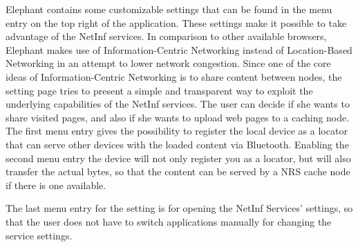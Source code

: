Elephant contains some customizable settings that can be found in the menu entry on the top right of the application.
These settings make it possible to take advantage of the NetInf services. In comparison to other
available browsers, Elephant makes use of Information-Centric Networking instead of Location-Based Networking
in an attempt to lower network congestion.
Since one of the core ideas of Information-Centric Networking is to share content between nodes, the setting page
tries to present a simple and transparent way to exploit the underlying capabilities of the NetInf services.
The user can decide if she wants to share visited pages, and also if she wants to upload web pages to a caching node.
The first menu entry gives the possibility to register the local device as a locator that can serve other devices
with the loaded content via Bluetooth.
Enabling the second menu entry the device will not only register you as a locator, but will also transfer the actual bytes,
so that the content can be served by a NRS cache node if there is one available.

The last menu entry for the setting is for opening the NetInf Services' settings, so that the user does not have to switch applications
manually for changing the service settings.
\newpage

